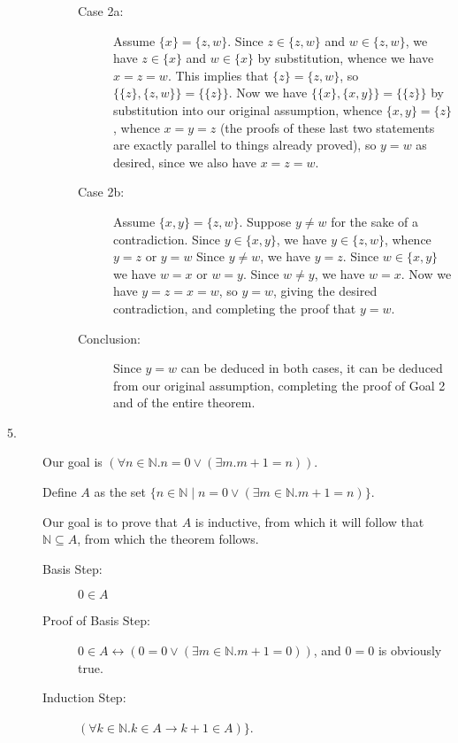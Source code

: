 \documentclass[12pt]{book}
\begin{document}
\begin{description}
\begin{description}
\begin{description}

\item[Case 2a:] Assume $\{x\} = \{z,w\}$.  Since $z \in \{z,w\}$ and
$w \in \{z,w\}$, we have $z\in \{x\}$ and $w \in \{x\}$ by
substitution, whence we have $x=z=w$.  This implies that $\{z\} =
\{z,w\}$, so $\{\{z\},\{z,w\}\} = \{\{z\}\}$.  Now we have
$\{\{x\},\{x,y\}\}=\{\{z\}\}$ by substitution into our original
assumption, whence $\{x,y\} = \{z\}$, whence $x=y=z$ (the proofs of
these last two statements are exactly parallel to things already
proved), so $y=w$ as desired, since we also have $x=z=w$.

\item[Case 2b:] Assume $\{x,y\} = \{z,w\}$.  Suppose $y \neq w$ for
the sake of a contradiction.  Since $y \in \{x,y\}$, we have $y \in
\{z,w\}$, whence $y=z$ or $y=w$  Since $y \neq w$, we have $y=z$.  Since
$w \in \{x,y\}$ we have $w =x$ or $w=y$.  Since $w \neq y$, we have $w=x$.
Now we have $y=z=x=w$, so $y=w$, giving the desired contradiction, and completing the proof that $y=w$.

\item[Conclusion:] Since $y=w$ can be deduced in both cases, it can be
deduced from our original assumption, completing the proof of Goal 2
and of the entire theorem.

\end{description}

\end{description}

\newpage

\item[5.]  Our goal is $(\forall n \in {\mathbb N}.n = 0 \vee (\exists
m.m+1=n))$.

Define $A$ as the set $\{n \in {\mathbb N} \mid n=0 \vee (\exists m \in{\mathbb N}.m+1=n)\}$.

Our goal is to prove that $A$ is inductive, from which it will follow
that ${\mathbb N} \subseteq A$, from which the theorem follows.

\begin{description}

\item[Basis Step:]  $0 \in A$

\item[Proof of Basis Step:] $0 \in A \leftrightarrow (0 = 0 \vee (\exists
m\in {\mathbb N}.m+1=0))$, and $0=0$ is obviously true.

\item[Induction Step:] $(\forall k \in {\mathbb N}.k \in A \rightarrow
k+1 \in A)\}$.


\end{description}
\end{description}
\end{document}
